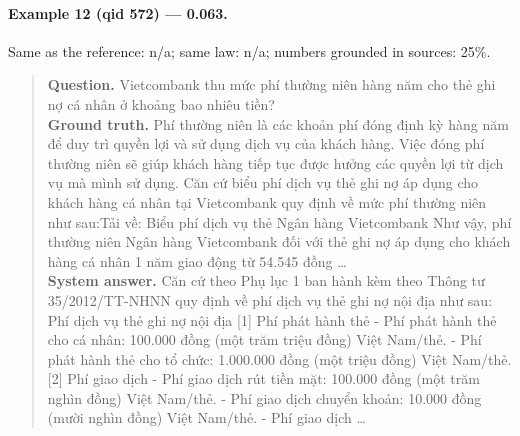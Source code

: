 \paragraph{Example 12 (qid 572) --- \rl{} 0.063.} Same \dieu{} as the reference: n/a; same law: n/a; numbers grounded in sources: 25\%.
\begin{quote}\small\textbf{Question.} Vietcombank thu mức phí thường niên hàng năm cho thẻ ghi nợ cá nhân ở khoảng bao nhiêu tiền?\\[2pt]
\textbf{Ground truth.} Phí thường niên là các khoản phí đóng định kỳ hàng năm để duy trì quyền lợi và sử dụng dịch vụ của khách hàng. Việc đóng phí thường niên sẽ giúp khách hàng tiếp tục được hưởng các quyền lợi từ dịch vụ mà mình sử dụng. Căn cứ biểu phí dịch vụ thẻ ghi nợ áp dụng cho khách hàng cá nhân tại Vietcombank quy định về mức phí thường niên như sau:Tải về: Biểu phí dịch vụ thẻ Ngân hàng Vietcombank Như vậy, phí thường niên Ngân hàng Vietcombank đối với thẻ ghi nợ áp dụng cho khách hàng cá nhân 1 năm giao động từ 54.545 đồng …\\[2pt]
\textbf{System answer.} Căn cứ theo Phụ lục 1 ban hành kèm theo Thông tư 35/2012/TT-NHNN quy định về phí dịch vụ thẻ ghi nợ nội địa như sau: Phí dịch vụ thẻ ghi nợ nội địa [1] Phí phát hành thẻ - Phí phát hành thẻ cho cá nhân: 100.000 đồng (một trăm triệu đồng) Việt Nam/thẻ. - Phí phát hành thẻ cho tổ chức: 1.000.000 đồng (một triệu đồng) Việt Nam/thẻ. [2] Phí giao dịch - Phí giao dịch rút tiền mặt: 100.000 đồng (một trăm nghìn đồng) Việt Nam/thẻ. - Phí giao dịch chuyển khoản: 10.000 đồng (mười nghìn đồng) Việt Nam/thẻ. - Phí giao dịch …\end{quote}
